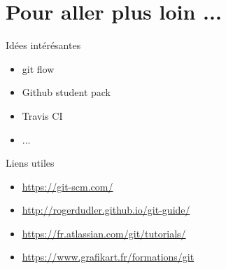 \documentclass{beamer}
\begin{document}
\section{Pour aller plus loin ...}

\begin{frame}{Idées intérésantes}
\begin{itemize}
    \item git flow
    \item Github student pack
    \item Travis CI
    \item ...
\end{itemize}
\end{frame}

\begin{frame}{Liens utiles}
\begin{itemize}
    \item \url{https://git-scm.com/}
    \item \url{http://rogerdudler.github.io/git-guide/}
    \item \url{https://fr.atlassian.com/git/tutorials/}
    \item \url{https://www.grafikart.fr/formations/git}
\end{itemize}
\end{frame}

\end{document}
